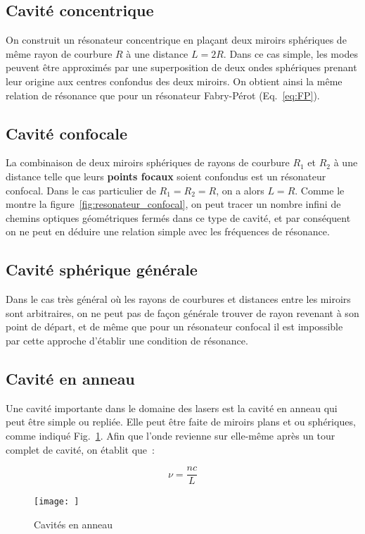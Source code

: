 \documentclass[a4paper]{book}
\begin{document}
\subsection{Cavité concentrique}
On construit un résonateur concentrique en plaçant deux miroirs sphériques de même rayon de courbure $R$ à une distance $L=2R$. Dans ce cas simple, les modes peuvent être approximés par une superposition de deux ondes sphériques prenant leur origine aux centres confondus des deux miroirs. On obtient ainsi la même relation de résonance que pour un résonateur Fabry-Pérot (Eq.~\ref{eq:FP}).

\subsection{Cavité confocale}
La combinaison de deux miroirs sphériques de rayons de courbure $R_1$ et $R_2$ à une distance telle que leurs \textbf{points focaux} soient confondus est un résonateur confocal. Dans le cas particulier de $R_1=R_2=R$, on a alors $L=R$. Comme le montre la figure~\ref{fig:resonateur_confocal}, on peut tracer un nombre infini de chemins optiques géométriques fermés dans ce type de cavité, et par conséquent on ne peut en déduire une relation simple avec les fréquences de résonance. 

\subsection{Cavité sphérique générale}
Dans le cas très général où les rayons de courbures et distances entre les miroirs sont arbitraires, on ne peut pas de façon générale trouver de rayon revenant à son point de départ, et de même que pour un résonateur confocal il est impossible par cette approche d'établir une condition de résonance. 

\subsection{Cavité en anneau}
Une cavité importante dans le domaine des lasers est la cavité en anneau qui peut être simple ou repliée. Elle peut être faite de miroirs plans et ou sphériques, comme indiqué Fig.~\ref{fig:ring_cavity}. Afin que l'onde revienne sur elle-même après un tour complet de cavité, on établit que~:

\begin{equation}
    \nu=\frac{nc}{L}
\end{equation}

\begin{figure}[!htbp]
\begin{center}
\texttt{[image: ]}
\end{center}
\caption{Cavités en anneau}
\label{fig:ring_cavity}
\end{figure}
\end{document}
